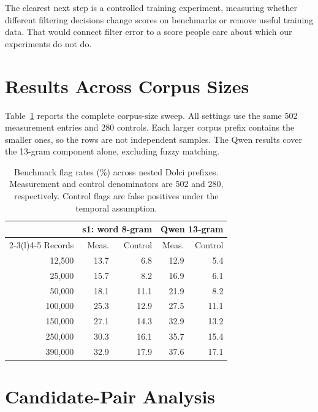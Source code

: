 \documentclass[11pt]{article}
\begin{document}
The clearest next step is a controlled training experiment, measuring whether different filtering decisions change scores on benchmarks or remove useful training data. That would connect filter error to a score people care about which our experiments do not do.



\clearpage
\appendix

\section{Results Across Corpus Sizes}
\label{app:scaling}

Table~\ref{tab:scaling} reports the complete corpus-size sweep. All settings use the same 502 measurement entries and 280 controls. Each larger corpus prefix contains the smaller ones, so the rows are not independent samples. The Qwen results cover the 13-gram component alone, excluding fuzzy matching.

\begin{table}[!t]
\centering
\small
\setlength{\tabcolsep}{3pt}
\begin{tabular}{@{}rrrrr@{}}
\toprule
& \multicolumn{2}{c}{s1: word 8-gram} & \multicolumn{2}{c}{Qwen 13-gram} \\
\cmidrule(lr){2-3}\cmidrule(l){4-5}
Records & Meas. & Control & Meas. & Control \\
\midrule
12,500  & 13.7 & 6.8  & 12.9 & 5.4 \\
25,000  & 15.7 & 8.2  & 16.9 & 6.1 \\
50,000  & 18.1 & 11.1 & 21.9 & 8.2 \\
100,000 & 25.3 & 12.9 & 27.5 & 11.1 \\
150,000 & 27.1 & 14.3 & 32.9 & 13.2 \\
250,000 & 30.3 & 16.1 & 35.7 & 15.4 \\
390,000 & 32.9 & 17.9 & 37.6 & 17.1 \\
\bottomrule
\end{tabular}
\caption{Benchmark flag rates (\%) across nested Dolci prefixes. Measurement and control denominators are 502 and 280, respectively. Control flags are false positives under the temporal assumption.}
\label{tab:scaling}
\end{table}

\section{Candidate-Pair Analysis}
\label{app:judge}
\end{document}
